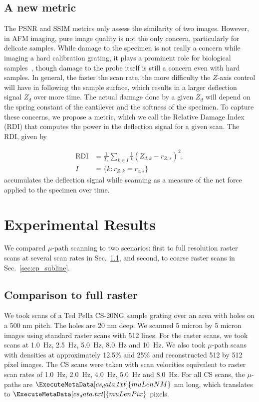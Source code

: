 \documentclass[journal]{IEEEtran}
\newcommand{\scanD}[1]{\ExecuteMetaData[cs_data.txt]{#1}}
\begin{document}
\subsection{A new metric}
The PSNR and SSIM metrics only assess the similarity of two images.
However, in AFM imaging, pure image quality is not the only concern,
particularly for delicate samples. While damage to the specimen is not really a concern while imaging a
hard calibration grating, it plays a prominent role for biological
samples~\cite{ando_highspeed_2008}, though damage to the probe itself
is still a concern even with hard samples. In general, the faster the scan rate, the more
difficulty the $Z$-axis control will have in following the sample
surface, which results in a larger deflection signal $Z_d$ over more time. The actual
damage done by a given $Z_d$ will depend on the spring constant of the
cantilever and the softness of the specimen. To capture these concerns, we propose a
metric, which we call the Relative Damage Index (RDI) that computes
the power in the deflection signal for a given scan. The RDI, given by

\begin{align}
  \text{RDI} &= \frac{1}{T_s}\sum_{k\in I} \frac{1}{k} \left(Z_{d,k} - r_{Z,s}\right)^2, \label{eqn:RDI}\\
  I & = \{k : r_{Z,k} = r_{z,s}\}
\end{align}
accumulates the deflection signal while scanning as a measure of the net force applied to the specimen  over time.

\section{Experimental Results}\label{sec:results}
We compared $\mu$-path scanning to two scenarios: first to full resolution raster scans at several scan rates in
Sec.~\ref{sec:cp_full}, and second, to coarse raster scans in
Sec.~\ref{sec:cp_subline}.

\subsection{Comparison to full raster}\label{sec:cp_full}
We took scans of a Ted Pella CS-20NG sample grating over an area with
holes on a 500 nm pitch. The holes are 20 nm deep. We scanned 5 micron
by 5 micron images using standard raster scans with 512 lines. For the
raster scans, we took scans at 1.0~Hz, 2.5~Hz, 5.0~Hz, 8.0~Hz and
10~Hz. We also took $\mu$-path scans with densities at approximately 12.5\% and
25\% and reconstructed 512 by 512 pixel images. The CS scans were
taken with scan velocities equivalent to raster scan rates of 1.0~Hz,
2.0~Hz, 4.0~Hz, 5.0~Hz and 8.0~Hz. For all CS scans, the $\mu$-paths are
$\scanD{muLenNM}$ nm long, which translates to $\scanD{muLenPix}$
pixels.
\end{document}
